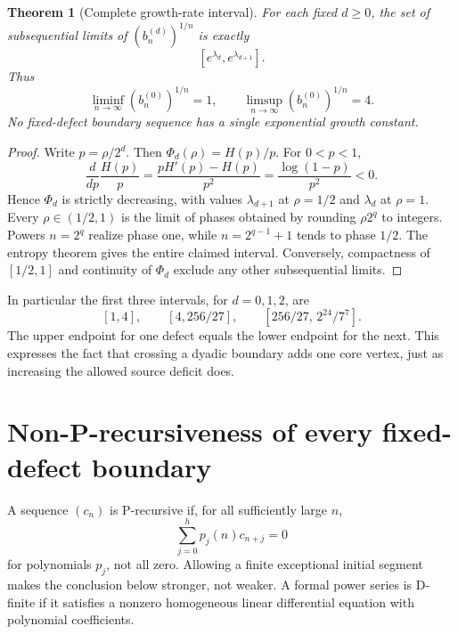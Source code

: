 \documentclass[11pt,a4paper]{article}
\newtheorem{theorem}{Theorem}[section]
\theoremstyle{definition}
\begin{document}
\begin{theorem}[Complete growth-rate interval]\label{sbd:thm:rates}
For each fixed $d\ge0$, the set of subsequential limits of
$(b_n^{(d)})^{1/n}$ is exactly
\begin{equation}\label{sbd:eq:rates}
 [e^{\lambda_d},e^{\lambda_{d+1}}].
\end{equation}
Thus
\begin{equation}\label{sbd:eq:extreme-rates}
 \liminf_{n\to\infty}(b_n^{(0)})^{1/n}=1,
 \qquad
 \limsup_{n\to\infty}(b_n^{(0)})^{1/n}=4.
\end{equation}
No fixed-defect boundary sequence has a single exponential growth
constant.
\end{theorem}
\begin{proof}
Write $p=\rho/2^d$. Then $\Phi_d(\rho)=H(p)/p$.
For $0<p<1$,
\[
 \frac{d}{dp}\frac{H(p)}p
 =\frac{pH'(p)-H(p)}{p^2}
 =\frac{\log(1-p)}{p^2}<0.
\]
Hence $\Phi_d$ is strictly decreasing, with values $\lambda_{d+1}$ at
$\rho=1/2$ and $\lambda_d$ at $\rho=1$.
Every $\rho\in(1/2,1)$ is the limit of phases obtained by rounding
$\rho2^q$ to integers. Powers $n=2^q$ realize phase one, while
$n=2^{q-1}+1$ tends to phase $1/2$. The entropy theorem gives the entire
claimed interval. Conversely, compactness of $[1/2,1]$ and continuity of
$\Phi_d$ exclude any other subsequential limits.
\end{proof}

In particular the first three intervals, for $d=0,1,2$, are
\[
 [1,4],\qquad[4,256/27],\qquad
 [256/27,\,2^{24}/7^7].
\]
The upper endpoint for one defect equals the lower endpoint for the next.
This expresses the fact that crossing a dyadic boundary adds one core
vertex, just as increasing the allowed source deficit does.

\section{Non-P-recursiveness of every fixed-defect boundary}

A sequence $(c_n)$ is P-recursive if, for all sufficiently large $n$,
\begin{equation}\label{sbd:eq:prec}
 \sum_{j=0}^{h}p_j(n)c_{n+j}=0
\end{equation}
for polynomials $p_j$, not all zero. Allowing a finite exceptional initial
segment makes the conclusion below stronger, not weaker.
A formal power series is D-finite if it satisfies a nonzero homogeneous
linear differential equation with polynomial coefficients.
\end{document}

